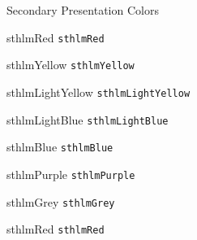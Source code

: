 \documentclass[compress]{beamer}
\begin{document}
\begin{frame}{Secondary Presentation Colors}
	\begin{multicols}{2}
		
		\begin{beamercolorbox}[wd=\linewidth,ht=2ex,dp=0.7ex]{sthlmRed}
			\texttt{sthlmRed}
		\end{beamercolorbox}
		
		\begin{beamercolorbox}[wd=\linewidth,ht=2ex,dp=0.7ex]{sthlmYellow}
			\texttt{sthlmYellow}
		\end{beamercolorbox}
		
		\begin{beamercolorbox}[wd=\linewidth,ht=2ex,dp=0.7ex]{sthlmLightYellow}
			\texttt{sthlmLightYellow}
		\end{beamercolorbox}
		
		\begin{beamercolorbox}[wd=\linewidth,ht=2ex,dp=0.7ex]{sthlmLightBlue}
			\texttt{sthlmLightBlue}
		\end{beamercolorbox}
		
		\begin{beamercolorbox}[wd=\linewidth,ht=2ex,dp=0.7ex]{sthlmBlue}
			\texttt{sthlmBlue}
		\end{beamercolorbox}
		
		\begin{beamercolorbox}[wd=\linewidth,ht=2ex,dp=0.7ex]{sthlmPurple}
			\texttt{sthlmPurple}
		\end{beamercolorbox}
		
		\begin{beamercolorbox}[wd=\linewidth,ht=2ex,dp=0.7ex]{sthlmGrey}
			\texttt{sthlmGrey}
		\end{beamercolorbox}
		
		
		
		\begin{beamercolorbox}[wd=\linewidth,ht=2ex,dp=0.7ex]{sthlmRed}
			\texttt{sthlmRed}
		\end{beamercolorbox}
		

\end{multicols}
\end{frame}
\end{document}
